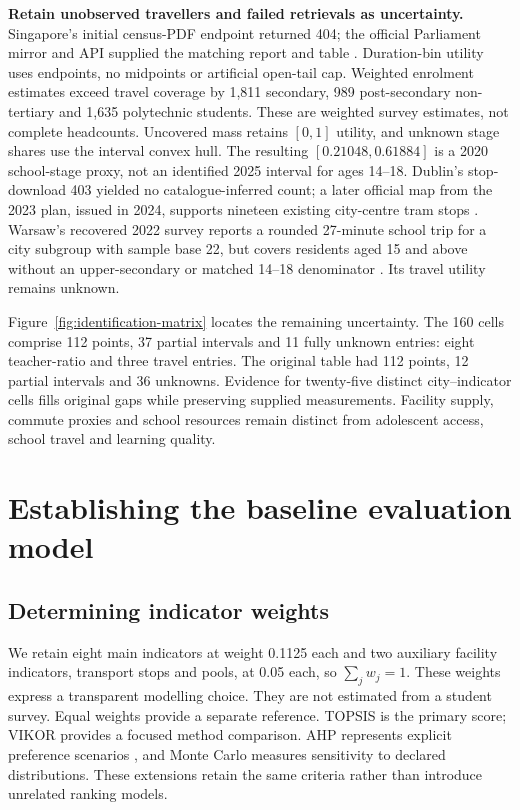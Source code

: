\textbf{Retain unobserved travellers and failed retrievals as uncertainty.}
Singapore's initial census-PDF endpoint returned 404; the official Parliament
mirror and API supplied the matching report and table \cite{singapore}.
Duration-bin utility uses endpoints, no midpoints or artificial open-tail cap.
Weighted enrolment estimates exceed travel coverage by 1,811 secondary,
989 post-secondary non-tertiary and 1,635 polytechnic students. These are
weighted survey estimates, not complete headcounts. Uncovered mass
retains $[0,1]$ utility, and unknown stage shares use the interval convex hull.
The resulting $[0.21048,0.61884]$ is a 2020 school-stage proxy, not an identified
2025 interval for ages 14--18.
Dublin's stop-download 403 yielded no catalogue-inferred count; a later official
map from the 2023 plan, issued in 2024, supports nineteen existing
city-centre tram stops \cite{dublin}.
Warsaw's recovered 2022 survey reports a rounded 27-minute school trip for a
city subgroup with sample base 22, but covers residents aged 15 and above
without an upper-secondary or matched 14--18 denominator \cite{warsaw2022}.
Its travel utility remains unknown.

Figure~\ref{fig:identification-matrix} locates the remaining uncertainty.
The 160 cells comprise 112 points, 37 partial intervals and 11 fully unknown
entries: eight teacher-ratio and three travel entries. The original table had
112 points, 12 partial intervals and 36 unknowns. Evidence for twenty-five distinct
city--indicator cells fills original gaps while preserving supplied measurements.
Facility supply, commute proxies and school resources remain distinct from
adolescent access, school travel and learning quality.



\section{Establishing the baseline evaluation model}
\subsection{Determining indicator weights}
We retain eight main indicators at weight 0.1125 each and two auxiliary facility
indicators, transport stops and pools, at 0.05 each, so $\sum_jw_j=1$.
These weights express a transparent modelling choice. They are not estimated
from a student survey. Equal weights provide a separate reference.
TOPSIS is the primary score; VIKOR provides a focused method comparison.
AHP represents explicit preference scenarios \cite{saaty}, and Monte Carlo measures
sensitivity to declared distributions. These extensions retain the same
criteria rather than introduce unrelated ranking models.

